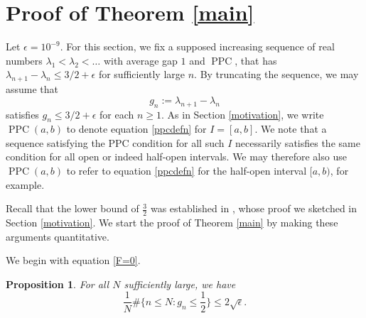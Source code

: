 \documentclass[12pt]{amsart}
\newtheorem{proposition}{Proposition}[section]
\theoremstyle{definition}
\newcommand{\vs}{\vspace{3mm}}
\newcommand{\ep}{\epsilon}
\newcommand{\lam}{\lambda}
\DeclareMathOperator{\PPC}{PPC}
\begin{document}
\vs

\section{Proof of Theorem \ref{main}}\label{proofofmaintheorem}

Let $\ep = 10^{-9}$. For this section, we fix a supposed increasing sequence of real numbers $\lam_1 < \lam_2 < \dots$ with average gap $1$ and $\PPC$, that has $\lam_{n+1}-\lam_n \le 3/2+\ep$ for sufficiently large $n$. By truncating the sequence, we may assume that $$g_n := \lambda_{n+1}-\lam_n$$ satisfies $g_n \le 3/2+\ep$ for each $n \ge 1$. As in Section \ref{motivation}, we write $\PPC(a,b)$ to denote equation \eqref{ppcdefn} for $I = [a,b]$. We note that a sequence satisfying the PPC condition for all such $I$ necessarily satisfies the same condition for all open or indeed half-open intervals. We may therefore also use $\PPC(a,b)$ to refer to equation \eqref{ppcdefn} for the half-open interval $[a,b)$, for example.

\vs

Recall that the lower bound of $\frac{3}{2}$ was established in \cite{abr}, whose proof we sketched in Section \ref{motivation}. We start the proof of Theorem \ref{main} by making these arguments quantitative.

\vs

We begin with equation \eqref{F=0}.

\vspace{1.5mm}

\begin{proposition}\label{smalldensity}
For all $N$ sufficiently large, we have $$\frac{1}{N}\#\{n \le N : g_n \le \frac{1}{2}\} \le 2\sqrt{\epsilon}.$$
\end{proposition}
\end{document}
